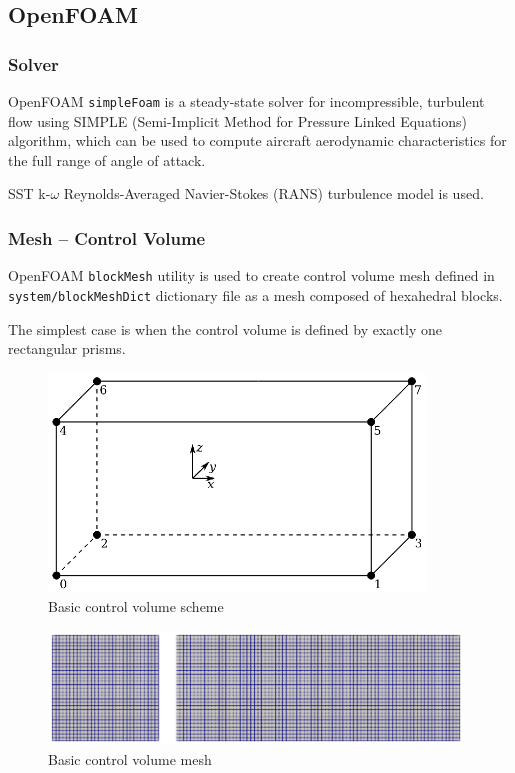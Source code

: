 \subsection{OpenFOAM}

\subsubsection{Solver}

OpenFOAM \texttt{simpleFoam} is a steady-state solver for incompressible, turbulent flow using SIMPLE (Semi-Implicit Method for Pressure Linked Equations) algorithm, which can be used to compute aircraft aerodynamic characteristics for the full range of angle of attack. \cite{Greenshields2018, MoukalledManganiDarwish2016, VersteegMalalasekera2007}

SST k-$\omega$ Reynolds-Averaged Navier-Stokes (RANS) turbulence model is used.

\subsubsection{Mesh -- Control Volume}

OpenFOAM \texttt{blockMesh} utility is used to create control volume mesh defined in \texttt{system/blockMeshDict} dictionary file as a mesh composed of hexahedral blocks.

The simplest case is when the control volume is defined by exactly one rectangular prisms.

\begin{figure}[h!]
  \centering
  \includegraphics[width=100mm]{images/openfoam_control_volume_1_1.eps}
  \caption{Basic control volume scheme}
\end{figure}

\begin{figure}[h!]
  \centering
  \includegraphics[width=110mm]{images/openfoam_control_volume_1_1_para.eps}
  \caption{Basic control volume mesh}
\end{figure}

